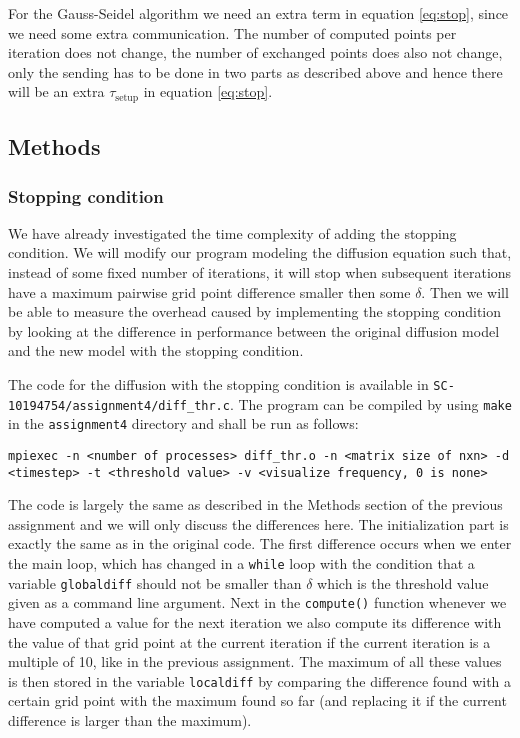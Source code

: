 \documentclass[11pt,a4paper,onecolumn]{article}
\begin{document}
For the Gauss-Seidel algorithm we need an extra term in equation \ref{eq:stop}, since we need some extra communication. The number of computed points per iteration does not change, the number of exchanged points does also not change, only the sending has to be done in two parts as described above and hence there will be an extra $\tau_{\text{setup}}$ in equation \ref{eq:stop}.

\subsection{Methods}
\subsubsection{Stopping condition}
We have already investigated the time complexity of adding the stopping condition. We will modify our program modeling the diffusion equation such that, instead of some fixed number of iterations, it will stop when subsequent iterations have a maximum pairwise grid point difference smaller then some $\delta$. Then we will be able to measure the overhead caused by implementing the stopping condition by looking at the difference in performance between the original diffusion model and the new model with the stopping condition.

The code for the diffusion with the stopping condition is available in \texttt{SC-10194754/assignment4/diff\_thr.c}. The program can be compiled by using \texttt{make} in the \texttt{assignment4} directory and shall be run as follows:

\begin{center}
  \texttt{mpiexec -n <number of processes> diff\_thr.o -n <matrix size of nxn> -d <timestep> -t <threshold value> -v <visualize frequency, 0 is none>}
\end{center}

The code is largely the same as described in the Methods section of the previous assignment and we will only discuss the differences here. The initialization part is exactly the same as in the original code. The first difference occurs when we enter the main loop, which has changed in a \texttt{while} loop with the condition that a variable \texttt{globaldiff} should not be smaller than $\delta$ which is the threshold value given as a command line argument. Next in the \texttt{compute()} function whenever we have computed a value for the next iteration we also compute its difference with the value of that grid point at the current iteration if the current iteration is a multiple of 10, like in the previous assignment. The maximum of all these values is then stored in the variable \texttt{localdiff} by comparing the difference found with a certain grid point with the maximum found so far (and replacing it if the current difference is larger than the maximum). 
\end{document}
